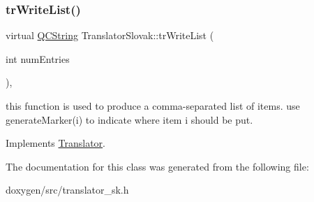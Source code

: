 \subsubsection{\texorpdfstring{trWriteList()}{trWriteList()}}
{\footnotesize\ttfamily virtual \mbox{\hyperlink{class_q_c_string}{Q\+C\+String}} Translator\+Slovak\+::tr\+Write\+List (\begin{DoxyParamCaption}\item[{int}]{num\+Entries }\end{DoxyParamCaption})\hspace{0.3cm}{\ttfamily [inline]}, {\ttfamily [virtual]}}

this function is used to produce a comma-\/separated list of items. use generate\+Marker(i) to indicate where item i should be put. 

Implements \mbox{\hyperlink{class_translator}{Translator}}.



The documentation for this class was generated from the following file\+:\begin{DoxyCompactItemize}
\item 
doxygen/src/translator\+\_\+sk.\+h\end{DoxyCompactItemize}
